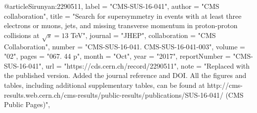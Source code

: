 @article{Sirunyan:2290511,
      label          = "CMS-SUS-16-041",
      author        = "{CMS collaboration}",
      title         = "{Search for supersymmetry in events with at least three
                       electrons or muons, jets, and missing transverse momentum
                       in proton-proton collisions at $ \sqrt{s}=13 $ TeV}",
      journal       = "JHEP",
      collaboration = "CMS Collaboration",
      number        = "CMS-SUS-16-041. CMS-SUS-16-041-003",
      volume        = "02",
      pages         = "067. 44 p",
      month         = "Oct",
      year          = "2017",
      reportNumber  = "CMS-SUS-16-041",
      url           = "https://cds.cern.ch/record/2290511",
      note          = "Replaced with the published version. Added the journal
                       reference and DOI. All the figures and tables, including
                       additional supplementary tables, can be found at
                       http://cms-results.web.cern.ch/cms-results/public-results/publications/SUS-16-041/
                       (CMS Public Pages)",
}

